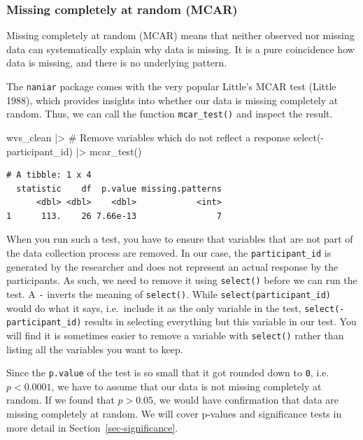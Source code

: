 \documentclass[
  letterpaper,
  DIV=11,
  numbers=noendperiod]{scrreprt}
\newenvironment{Shaded}{\begin{snugshade}}{\end{snugshade}}
\newcommand{\CommentTok}[1]{\textcolor[rgb]{0.37,0.37,0.37}{#1}}
\newcommand{\FunctionTok}[1]{\textcolor[rgb]{0.28,0.35,0.67}{#1}}
\newcommand{\NormalTok}[1]{\textcolor[rgb]{0.00,0.23,0.31}{#1}}
\newcommand{\SpecialCharTok}[1]{\textcolor[rgb]{0.37,0.37,0.37}{#1}}
\begin{document}
\subsubsection{Missing completely at random
(MCAR)}\label{sec-missing-completetly-at-random-mcar}

Missing completely at random (MCAR) means that neither observed nor
missing data can systematically explain why data is missing. It is a
pure coincidence how data is missing, and there is no underlying
pattern.

The \texttt{naniar} package comes with the very popular Little's MCAR
test (Little 1988), which provides insights into whether our data is
missing completely at random. Thus, we can call the function
\texttt{mcar\_test()} and inspect the result.

\begin{Shaded}
\begin{Highlighting}[]
\NormalTok{wvs\_clean }\SpecialCharTok{|\textgreater{}}
  \CommentTok{\# Remove variables which do not reflect a response}
  \FunctionTok{select}\NormalTok{(}\SpecialCharTok{{-}}\NormalTok{participant\_id) }\SpecialCharTok{|\textgreater{}}
  \FunctionTok{mcar\_test}\NormalTok{()}
\end{Highlighting}
\end{Shaded}

\begin{verbatim}
# A tibble: 1 x 4
  statistic    df  p.value missing.patterns
      <dbl> <dbl>    <dbl>            <int>
1      113.    26 7.66e-13                7
\end{verbatim}

When you run such a test, you have to ensure that variables that are not
part of the data collection process are removed. In our case, the
\texttt{participant\_id} is generated by the researcher and does not
represent an actual response by the participants. As such, we need to
remove it using \texttt{select()} before we can run the test. A
\texttt{-} inverts the meaning of \texttt{select()}. While
\texttt{select(participant\_id)} would do what it says, i.e.~include it
as the only variable in the test, \texttt{select(-participant\_id)}
results in selecting everything but this variable in our test. You will
find it is sometimes easier to remove a variable with \texttt{select()}
rather than listing all the variables you want to keep.

Since the \texttt{p.value} of the test is so small that it got rounded
down to \texttt{0}, i.e.~\(p<0.0001\), we have to assume that our data
is not missing completely at random. If we found that \(p>0.05\), we
would have confirmation that data are missing completely at random. We
will cover p-values and significance tests in more detail in
Section~\ref{sec-significance}.
\end{document}

